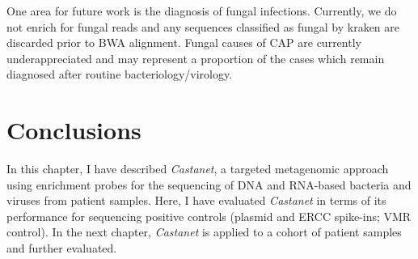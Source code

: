 One area for future work is the diagnosis of fungal infections. Currently, we do not enrich for fungal reads and any sequences classified as fungal by kraken are discarded prior to BWA alignment. Fungal causes of CAP are currently underappreciated \parencite{Chen2001} and may represent a proportion of the cases which remain diagnosed after routine bacteriology/virology. 

\section{Conclusions}
In this chapter, I have described \textit{Castanet}, a targeted metagenomic approach using enrichment probes for the sequencing of DNA and RNA-based bacteria and viruses from patient samples. Here, I have evaluated \textit{Castanet} in terms of its performance for sequencing positive controls (plasmid and ERCC spike-ins; VMR control). In the next chapter, \textit{Castanet} is applied to a cohort of patient samples and further evaluated.

